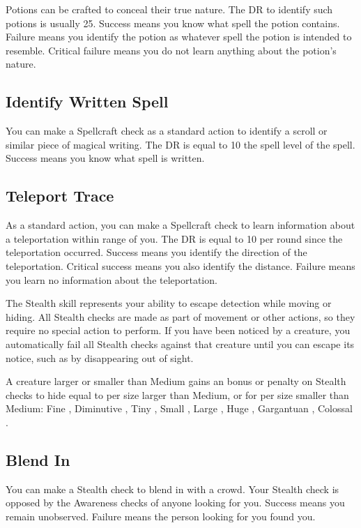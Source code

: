         Potions can be crafted to conceal their true nature.
        The DR to identify such potions is usually 25.
        Success means you know what spell the potion contains.
        Failure means you identify the potion as whatever spell the potion is intended to resemble.
        Critical failure means you do not learn anything about the potion's nature.

    \subsection{Identify Written Spell}
        You can make a Spellcraft check as a standard action to identify a scroll or similar piece of magical writing.
        The DR is equal to 10 \add the spell level of the spell.
        Success means you know what spell is written.

    \subsection{Teleport Trace}
        As a standard action, you can make a Spellcraft check to learn information about a teleportation within \rngmed range of you.
        The DR is equal to 10  per round since the teleportation occurred.
        Success means you identify the direction of the teleportation.
        Critical success means you also identify the distance.
        Failure means you learn no information about the teleportation.

\newpage
{}
        The Stealth skill represents your ability to escape detection while moving or hiding. All Stealth checks are made as part of movement or other actions, so they require no special action to perform. If you have been noticed by a creature, you automatically fail all Stealth checks against that creature until you can escape its notice, such as by disappearing out of sight.

        \label{Size and Stealth} A creature larger or smaller than Medium gains an bonus or penalty on Stealth checks to hide equal to  per size larger than Medium, or  for per size smaller than Medium: Fine , Diminutive , Tiny , Small , Large , Huge , Gargantuan , Colossal .

    \subsection{Blend In}
        You can make a Stealth check to blend in with a crowd. Your Stealth check is opposed by the Awareness checks of anyone looking for you. Success means you remain unobserved. Failure means the person looking for you found you.

